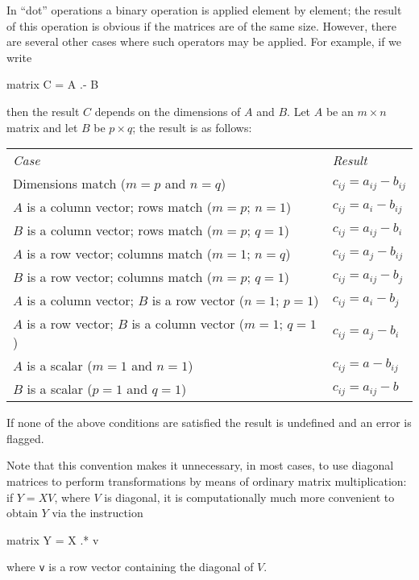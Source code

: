 In ``dot'' operations a binary operation is applied element by
element; the result of this operation is obvious if the matrices are
of the same size. However, there are several other cases where such
operators may be applied.  For example, if we write
%
\begin{code}
matrix C = A .- B
\end{code}
% 
then the result $C$ depends on the dimensions of $A$ and $B$.  Let $A$
be an $m \times n$ matrix and let $B$ be $p \times q$; the result is
as follows:
\begin{center}
  \begin{tabular}{ll}
    \textit{Case} & \textit{Result} \\[4pt]
    Dimensions match ($m=p$ and $n=q$) & 
    $c_{ij} = a_{ij} -  b_{ij}$ \\ 
    $A$ is a column vector; rows match ($m=p$; $n=1$) &
    $c_{ij} = a_{i} - b_{ij}$ \\ 
    $B$ is a column vector; rows match ($m=p$; $q=1$) &
    $c_{ij} = a_{ij} - b_{i}$ \\ 
    $A$ is a row vector; columns match ($m=1$; $n=q$) &
    $c_{ij} = a_{j} - b_{ij}$ \\ 
    $B$ is a row vector; columns match ($m=p$; $q=1$) &
    $c_{ij} = a_{ij} - b_{j}$ \\ 
    $A$ is a column vector; $B$ is a row vector ($n=1$; $p=1$) &
    $c_{ij} = a_{i} - b_{j}$ \\ 
    $A$ is a row vector; $B$ is a column vector ($m=1$; $q=1$) &
    $c_{ij} = a_{j} - b_{i}$ \\ 
    $A$ is a scalar ($m=1$ and $n=1$) &
    $c_{ij} = a - b_{ij}$ \\ 
    $B$ is a scalar ($p=1$ and $q=1$) &
    $c_{ij} = a_{ij} - b$ \\ 
  \end{tabular}
\end{center}
%
If none of the above conditions are satisfied the result is undefined
and an error is flagged.

Note that this convention makes it unnecessary, in most cases, to use
diagonal matrices to perform transformations by means of ordinary
matrix multiplication: if $Y = XV$, where $V$ is diagonal, it is
computationally much more convenient to obtain $Y$ via the instruction
%
\begin{code}
matrix Y = X .* v
\end{code}
%
where \texttt{v} is a row vector containing the diagonal of $V$.

